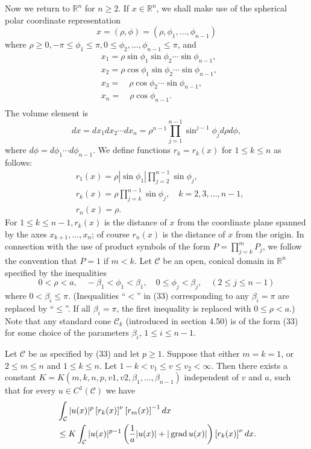 \begin{para}
  Now we return to $\mathbb{R}^n$ for $n \geq 2$. If $x \in \mathbb{R}^n$, we shall make use of the spherical polar coordinate representation
  \[
  x=(\rho, \phi)=\left(\rho, \phi_1, \ldots, \phi_{n-1}\right)
  \]
  where $\rho \geq 0,-\pi \leq \phi_1 \leq \pi, 0 \leq \phi_2, \ldots, \phi_{n-1} \leq \pi$, and
  \[
  \begin{aligned}
  & x_1=\rho \sin \phi_1 \sin \phi_2 \cdots \sin \phi_{n-1}, \\
  & x_2=\rho \cos \phi_1 \sin \phi_2 \cdots \sin \phi_{n-1} \text {, } \\
  & x_3=\quad \rho \cos \phi_2 \cdots \sin \phi_{n-1} \text {, } \\
  & x_n=\quad \rho \cos \phi_{n-1} \text {. } \\
  &
  \end{aligned}
  \]
  The volume element is
  \[
  d x=d x_1 d x_2 \cdots d x_n=\rho^{n-1} \prod_{j=1}^{n-1} \sin ^{j-1} \phi_j d \rho d \phi,
  \]
  where $d \phi=d \phi_1 \cdots d \phi_{n-1}$.
  We define functions $r_k=r_k(x)$ for $1 \leq k \leq n$ as follows:
  \[
  \begin{aligned}
  & r_1(x)=\rho\left|\sin \phi_1\right| \prod_{j=2}^{n-1} \sin \phi_j, \\
  & r_k(x)=\rho \prod_{j=k}^{n-1} \sin \phi_j, \quad k=2,3, \ldots, n-1, \\
  & r_n(x)=\rho .
  \end{aligned}
  \]
  For $1 \leq k \leq n-1, r_k(x)$ is the distance of $x$ from the coordinate plane spanned by the axes $x_{k+1}, \ldots, x_n$; of course $r_n(x)$ is the distance of $x$ from the origin. In connection with the use of product symbols of the form $P=\prod_{j=k}^m P_j$, we follow the convention that $P=1$ if $m<k$.
  Let $\mathcal{C}$ be an open, conical domain in $\mathbb{R}^n$ specified by the inequalities
  \[
  0<\rho<a, \quad-\beta_1<\phi_1<\beta_1, \quad 0 \leq \phi_j<\beta_j, \quad(2 \leq j \leq n-1)
  \]
  where $0<\beta_i \leq \pi$. (Inequalities ``$<$'' in (33) corresponding to any $\beta_i=\pi$
  are replaced by ``$\leq$''. If all $\beta_i=\pi$, the first inequality is replaced with $0 \leq \rho<a$.)
  Note that any standard cone $\mathcal{C}_k$ (introduced in section 4.50) is of the form (33)
  for some choice of the parameters $\beta_i$, $1 \leq i \leq n-1$.
\end{para}


\begin{lemma}
  Let $\mathcal{C}$ be as specified by (33) and let $p \geq 1$. Suppose that either $m=k=1$, or $2 \leq m \leq n$ and $1 \leq k \leq n$. Let $1-k<v_1 \leq v \leq v_2<\infty$. Then there exists a constant $K=K\left(m, k, n, p, v 1, v 2, \beta_1, \ldots, \beta_{n-1}\right)$ independent of $v$ and $a$, such that for every $u \in C^1(\mathcal{C})$ we have
  \[
  \begin{aligned}
  & \int_{\mathcal{C}}|u(x)|^p\left[r_k(x)\right]^\nu\left[r_m(x)\right]^{-1} d x \\
  & \leq K \int_{\mathcal{C}}|u(x)|^{p-1}\left(\frac{1}{a}|u(x)|+|\operatorname{grad} u(x)|\right)\left[r_k(x)\right]^\nu d x .
  \end{aligned}
  \]
\end{lemma}

